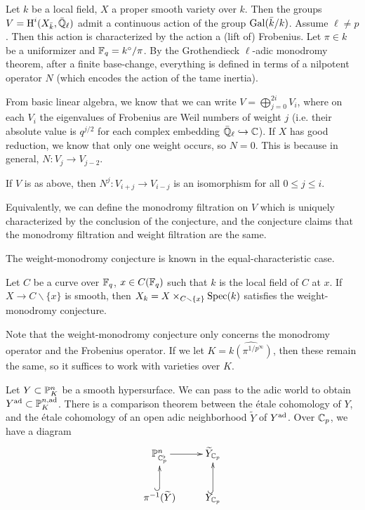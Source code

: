 \documentclass{article}
\begin{document}
Let $k$ be a local field, $X$ a proper smooth variety over $k$. Then the groups 
$V=\operatorname{H}^i(X_{\bar k},\bar{\mathbb{Q}}_\ell)$ admit a continuous action of the group 
$\operatorname{Gal}(\bar k/k)$. Assume $\ell\ne p$. Then this action is characterized by the 
action a (lift of) Frobenius. Let $\pi\in k$ be a uniformizer and 
$\mathbb{F}_q=k^\circ/\pi$. By the Grothendieck $\ell$-adic monodromy theorem, after a 
finite base-change, everything is defined in terms of a nilpotent operator 
$N$ (which encodes the action of the tame inertia). 

From basic linear algebra, we know that we can write 
$V=\bigoplus_{j=0}^{2 i} V_i$, where on each $V_i$ the eigenvalues of Frobenius 
are Weil numbers of weight $j$ (i.e. their absolute value is 
$q^{j/2}$ for each complex embedding $\bar{\mathbb{Q}}_\ell\hookrightarrow \mathbb{C}$). If 
$X$ has good reduction, we know that only one weight occurs, so $N=0$. 
This is because in general, $N:V_j \to V_{j-2}$. 

\begin{conjecture}[Deligne]
If $V$ is as above, then $N^j:V_{i+j} \to V_{i-j}$ is an isomorphism for all 
$0\leqslant j\leqslant i$. 
\end{conjecture}

Equivalently, we can define the monodromy filtration on $V$ which is uniquely 
characterized by the conclusion of the conjecture, and the conjecture claims 
that the monodromy filtration and weight filtration are the same. 

The weight-monodromy conjecture is known in the equal-characteristic case. 

\begin{theorem}[Deligne]
Let $C$ be a curve over $\mathbb{F}_q$, $x\in C(\mathbb{F}_q)$ such that 
$k$ is the local field of $C$ at $x$. If $X\to C\smallsetminus \{x\}$ is 
smooth, then $X_k=X\times_{C\smallsetminus \{x\}} \operatorname{Spec}(k)$ satisfies the 
weight-monodromy conjecture. 
\end{theorem}

Note that the weight-monodromy conjecture only concerns the monodromy operator 
and the Frobenius operator. If we let $K=\widehat{k(\pi^{1/p^\infty})}$, then these 
remain the same, so it suffices to work with varieties over $K$. 

Let $Y\subset \mathbb{P}_K^n$ be a smooth hypersurface. We can pass to the adic world 
to obtain $Y^{\textnormal{ad}}\subset \mathbb{P}_K^{n,\textnormal{ad}}$. There is a comparison theorem between 
the \'etale cohomology of $Y$, and the \'etale cohomology of an open adic 
neighborhood $\widetilde Y$ of $Y^{\textnormal{ad}}$. Over $\mathbb{C}_p$, we have a diagram 
\[\xymatrix{
  \dP_{\dC_p^\flat}^n \ar[r] 
    & \widetilde Y_{\dC_p} \\
  \pi^{-1}(\widetilde Y) \ar@{^{(}->}[u] 
    & Y_{\dC_p} \ar@{^{(}->}[u] 
}\]
\end{document}

